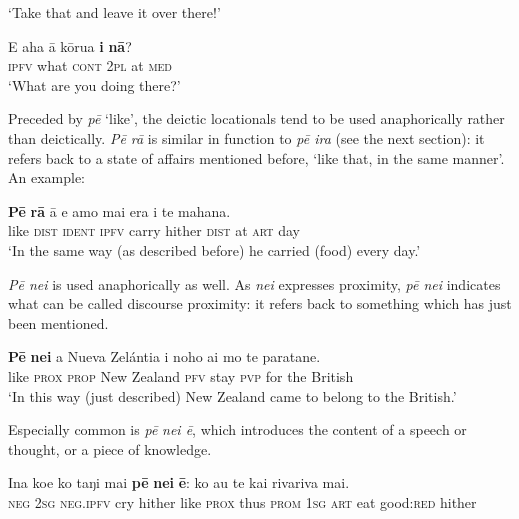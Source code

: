 \glt 
‘Take that and leave it over there!’ \textstyleExampleref{[R208.173]} 
\z

\ea\label{ex:4.228}
\gll E aha {\ꞌ}ā kōrua \textbf{{\ꞌ}i} \textbf{nā}?\\
\textsc{ipfv} what \textsc{cont} \textsc{2pl} at \textsc{med}\\

\glt 
‘What are you doing there?’ \textstyleExampleref{[R416.514]} 
\z

Preceded by \textit{pē} ‘like’, the deictic locationals tend to be used anaphorically rather than deictically. \textit{Pē rā} is similar in function to \textit{pē ira} (see the next section): it refers back to a state of affairs mentioned before, ‘like that, in the same manner’. An example:

\ea\label{ex:4.229}
\gll \textbf{Pē} \textbf{rā} {\ꞌ}ā e {\ꞌ}amo mai era {\ꞌ}i te mahana.\\
like \textsc{dist} \textsc{ident} \textsc{ipfv} carry hither \textsc{dist} at \textsc{art} day\\

\glt
‘In the same way (as described before) he carried (food) every day.’ \textstyleExampleref{[R372.139]} 
\z

\textit{Pē nei} is used anaphorically as well. As \textit{nei} expresses proximity,  \textit{pē nei} indicates what can be called discourse proximity: it refers back to something which has just been mentioned.

\ea\label{ex:4.230}
\gll \textbf{Pē} \textbf{nei} a Nueva Zelántia i noho ai mo te paratane. \\
like \textsc{prox} \textsc{prop} New Zealand \textsc{pfv} stay \textsc{pvp} for the British \\

\glt
‘In this way (just described) New Zealand came to belong to the British.’ \textstyleExampleref{[R346.022]} 
\z

Especially common is \textit{pē} \textit{nei ē}, which introduces the content of a speech or thought, or a piece of knowledge. 

\ea\label{ex:4.231}
\gll {\ꞌ}Ina koe ko taŋi mai \textbf{pē} \textbf{nei} \textbf{ē}: ko au te kai rivariva mai. \\
\textsc{neg} \textsc{2sg} \textsc{neg.ipfv} cry hither like \textsc{prox} thus \textsc{prom} \textsc{1sg} \textsc{art} eat good:\textsc{red} hither \\

